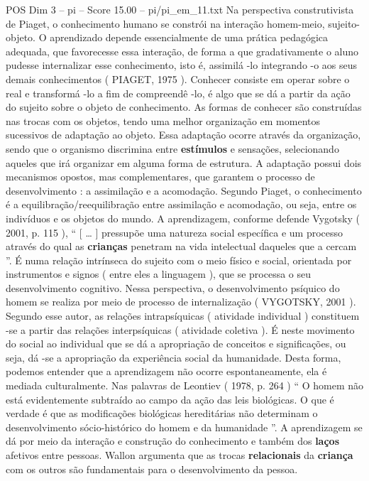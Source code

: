 \begin{textsample}{POS Dim 3 – pi – Score 15.00 – pi/pi\_em\_11.txt}
Na perspectiva construtivista de Piaget, o conhecimento humano se constrói na interação homem-meio, sujeito-objeto.
O aprendizado depende essencialmente de uma prática pedagógica adequada, que favorecesse essa interação, de forma a que gradativamente o aluno pudesse internalizar esse conhecimento, isto é, assimilá -lo integrando -o aos seus demais conhecimentos ( PIAGET, 1975 ).
Conhecer consiste em operar sobre o real e transformá -lo a fim de compreendê -lo, é algo que se dá a partir da ação do sujeito sobre o objeto de conhecimento.
As formas de conhecer são construídas nas trocas com os objetos, tendo uma melhor organização em momentos sucessivos de adaptação ao objeto.
Essa adaptação ocorre através da organização, sendo que o organismo discrimina entre \textbf{estímulos} e sensações, selecionando aqueles que irá organizar em alguma forma de estrutura.
A adaptação possui dois mecanismos opostos, mas complementares, que garantem o processo de desenvolvimento : a assimilação e a acomodação.
Segundo Piaget, o conhecimento é a equilibração/reequilibração entre assimilação e acomodação, ou seja, entre os indivíduos e os objetos do mundo.
A aprendizagem, conforme defende Vygotsky ( 2001, p. 115 ), “ [ … ] pressupõe uma natureza social específica e um processo através do qual as \textbf{crianças} penetram na vida intelectual daqueles que a cercam ”.
É numa relação intrínseca do sujeito com o meio físico e social, orientada por instrumentos e signos ( entre eles a linguagem ), que se processa o seu desenvolvimento cognitivo.
Nessa perspectiva, o desenvolvimento psíquico do homem se realiza por meio de processo de internalização ( VYGOTSKY, 2001 ).
Segundo esse autor, as relações intrapsíquicas ( atividade individual ) constituem -se a partir das relações interpsíquicas ( atividade coletiva ).
É neste movimento do social ao individual que se dá a apropriação de conceitos e significações, ou seja, dá -se a apropriação da experiência social da humanidade.
Desta forma, podemos entender que a aprendizagem não ocorre espontaneamente, ela é mediada culturalmente.
Nas palavras de Leontiev ( 1978, p. 264 ) “ O homem não está evidentemente subtraído ao campo da ação das leis biológicas.
O que é verdade é que as modificações biológicas hereditárias não determinam o desenvolvimento sócio-histórico do homem e da humanidade ”.
A aprendizagem se dá por meio da interação e construção do conhecimento e também dos \textbf{laços} afetivos entre pessoas.
Wallon argumenta que as trocas \textbf{relacionais} da \textbf{criança} com os outros são fundamentais para o desenvolvimento da pessoa.

\end{textsample}
